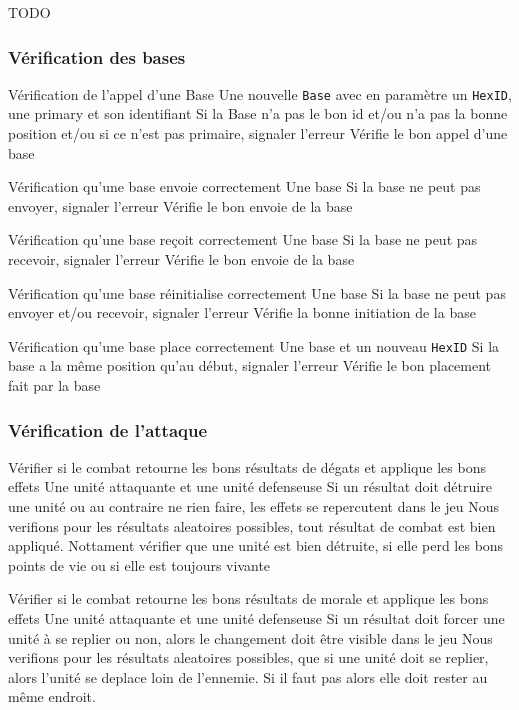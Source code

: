 TODO

\subsubsection{Vérification des bases}

\mytest
{Vérification de l'appel d'une Base}
{Une nouvelle {\tt Base} avec en paramètre un {\tt HexID}, une primary et son identifiant }
{Si la Base n'a pas le bon id et/ou n'a pas la bonne position et/ou si ce n'est pas primaire, signaler l'erreur }
{Vérifie le bon appel d'une base}

\mytest
{Vérification qu'une base envoie correctement}
{Une base}
{Si la base ne peut pas envoyer,  signaler l'erreur }
{Vérifie le bon envoie de la base }

\mytest
{Vérification qu'une base reçoit correctement}
{Une base}
{Si la base ne peut pas recevoir,  signaler l'erreur }
{Vérifie le bon envoie de la base }

\mytest
{Vérification qu'une base réinitialise correctement}
{Une base}
{Si la base ne peut pas envoyer et/ou recevoir,  signaler l'erreur }
{Vérifie la bonne initiation de la base }

\mytest
{Vérification qu'une base place correctement}
{Une base et un nouveau {\tt HexID}}
{Si la base a la même position qu'au début,  signaler l'erreur }
{Vérifie le bon placement fait par la  base }

\subsubsection{Vérification de l'attaque}

\mytest
{Vérifier si le combat retourne les bons résultats de dégats et applique les bons effets}
{Une unité attaquante et une unité defenseuse}
{Si un résultat doit détruire une unité ou au contraire ne rien faire, les effets se repercutent dans le jeu}
{Nous verifions pour les résultats aleatoires possibles, tout résultat de combat est bien appliqué. Nottament vérifier
    que une unité est bien détruite, si elle perd les bons points de vie ou si elle est toujours vivante}

\mytest
{Vérifier si le combat retourne les bons résultats de morale et applique les bons effets}
{Une unité attaquante et une unité defenseuse}
{Si un résultat doit forcer une unité à se replier ou non, alors le changement doit être visible dans le jeu}
{Nous verifions pour les résultats aleatoires possibles, que si une unité doit se replier, alors l'unité se
    deplace loin de l'ennemie. Si il faut pas alors elle doit rester au même endroit.}

